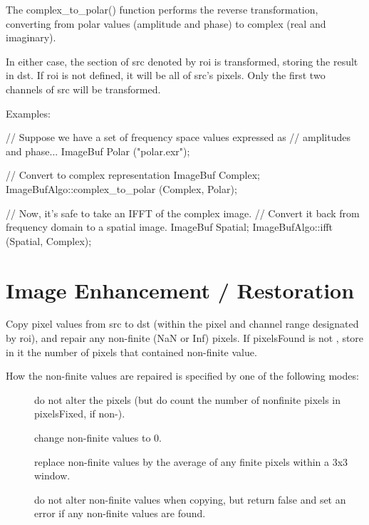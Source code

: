 The {\cf complex_to_polar()} function performs the reverse transformation,
converting from  polar values (amplitude and phase) to complex (real and
imaginary).

In either case,  the section of {\cf src} denoted by {\cf roi} is
transformed, storing the result in {\cf dst}. If {\cf roi} is not defined,
it will be all of {\cf src}'s pixels.  Only the first two channels of {\cf
src} will be transformed.

\smallskip
\noindent Examples:
\begin{code}
    // Suppose we have a set of frequency space values expressed as
    // amplitudes and phase...
    ImageBuf Polar ("polar.exr");

    // Convert to complex representation
    ImageBuf Complex;
    ImageBufAlgo::complex_to_polar (Complex, Polar);

    // Now, it's safe to take an IFFT of the complex image.
    // Convert it back from frequency domain to a spatial image.
    ImageBuf Spatial;
    ImageBufAlgo::ifft (Spatial, Complex);
\end{code}
\apiend



\section{Image Enhancement / Restoration}
\label{sec:iba:enhance}

 

Copy pixel values from {\cf src} to {\cf dst} (within the pixel and channel
range designated by {\cf roi}), and repair any non-finite ({\cf NaN} or {\cf
Inf}) pixels.  If {\cf pixelsFound} is not \NULL, store in it the number of
pixels that contained non-finite value.

How the non-finite values are repaired is specified by one of the
following modes:

\begin{description} 
\item[\spc] \spc
\item[\rm {}]   do not alter the pixels (but do count the number
                       of nonfinite pixels in {\cf *pixelsFixed}, if non-\NULL).
\item[\rm {}]  change non-finite values to 0.
\item[\rm {}]   replace non-finite values by the average of any
                     finite pixels within a 3x3 window.
\item[\rm {}]  do not alter non-finite values when copying,
                     but return {\cf false} and set an error if any non-finite
                     values are found.
\end{description}

